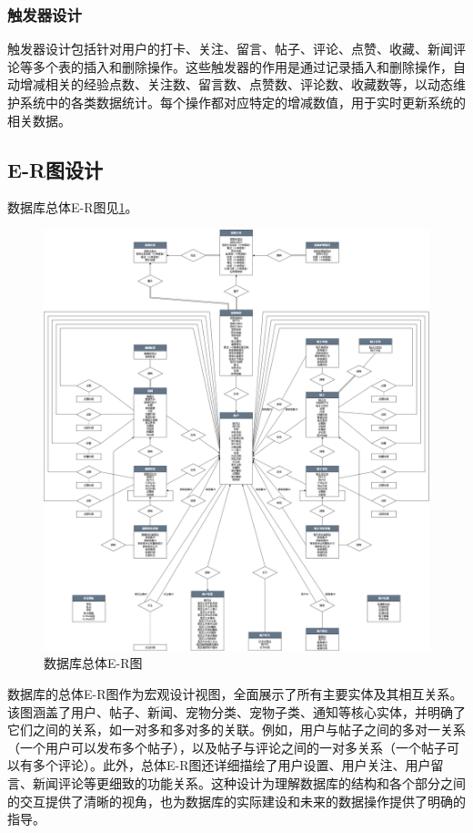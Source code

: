 \subsubsection{触发器设计}

触发器设计包括针对用户的打卡、关注、留言、帖子、评论、点赞、收藏、新闻评论等多个表的插入和删除操作。这些触发器的作用是通过记录插入和删除操作，自动增减相关的经验点数、关注数、留言数、点赞数、评论数、收藏数等，以动态维护系统中的各类数据统计。每个操作都对应特定的增减数值，用于实时更新系统的相关数据。

\subsection{E-R图设计}

数据库总体E-R图见\cref{fig:GeneralERDiagram}。

\begin{figure}[htbp]
	\centering
	\includegraphics[width=\textwidth]{figures/GeneralERDiagram.png}
	\caption{数据库总体E-R图}
	\label{fig:GeneralERDiagram}
\end{figure}

数据库的总体E-R图作为宏观设计视图，全面展示了所有主要实体及其相互关系。该图涵盖了用户、帖子、新闻、宠物分类、宠物子类、通知等核心实体，并明确了它们之间的关系，如一对多和多对多的关联。例如，用户与帖子之间的多对一关系（一个用户可以发布多个帖子），以及帖子与评论之间的一对多关系（一个帖子可以有多个评论）。此外，总体E-R图还详细描绘了用户设置、用户关注、用户留言、新闻评论等更细致的功能关系。这种设计为理解数据库的结构和各个部分之间的交互提供了清晰的视角，也为数据库的实际建设和未来的数据操作提供了明确的指导。
